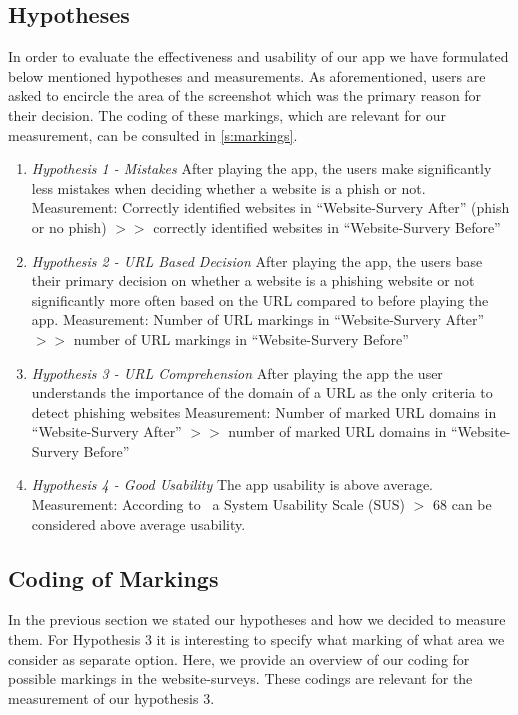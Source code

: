 \subsection{Hypotheses}
In order to evaluate the effectiveness and usability of our app we have formulated below mentioned hypotheses and measurements.
As aforementioned, users are asked to encircle the area of the screenshot which was the primary reason for their decision.
The coding of these markings, which are relevant for our measurement, can be consulted in \autoref{s:markings}.

\begin{enumerate}
	\item \textit{Hypothesis 1 - Mistakes} After playing the app, the users make significantly less mistakes when deciding whether a website is a phish or not.\newline
	Measurement: Correctly identified websites in ``Website-Survery After'' (phish or no phish) $>>$ correctly identified websites in ``Website-Survery Before''
	\item \textit{Hypothesis 2 - URL Based Decision} After playing the app, the users base their primary decision on whether a website is a phishing website or not significantly more often based on the URL compared to before playing the app.\newline
	Measurement: Number of URL markings in ``Website-Survery After'' $>>$ number of URL markings in ``Website-Survery Before''
	\item \textit{Hypothesis 3 - URL Comprehension} After playing the app the user understands the importance of the domain of a URL as the only criteria to detect phishing websites\newline
Measurement: Number of marked URL domains in ``Website-Survery After''  $>>$ number of marked URL domains in ``Website-Survery Before'' 
	\item \textit{Hypothesis 4 - Good Usability} The app usability is above average. \newline
Measurement: According to~\cite{sus}  a System Usability Scale (SUS) $>$ 68 can be considered above average usability.
\end{enumerate}

\subsection{Coding of Markings}
\label{s:markings}
In the previous section we stated our hypotheses and how we decided to measure them. For Hypothesis 3 it is interesting to specify what marking of what area we consider as separate option.
Here, we provide an overview of our coding for possible markings in the website-surveys.
These codings are relevant for the measurement of our hypothesis 3.


